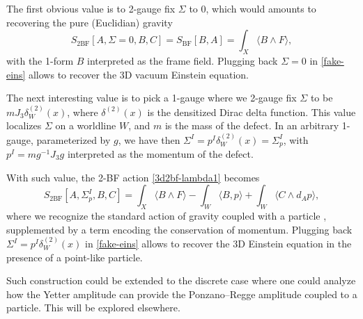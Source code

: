 \documentclass[onecolumn]{article}
\theoremstyle{theorem}
\theoremstyle{remark}
\theoremstyle{example}
\theoremstyle{definition}
\numberwithin{equation}{section}
\begin{document}

The first obvious value is to 2-gauge fix $\Sigma$ to $0$, which would amounts to recovering the pure (Euclidian) gravity 
\begin{equation}
    S_\text{2BF}[A,\Sigma=0, B,C] =S_\text{BF}[B,A]= \int_X \langle B \wedge F \rangle,
\end{equation}
with the 1-form $B$ interpreted as the frame field. Plugging back $\Sigma=0$ in \eqref{fake-eins} allows to recover the 3D vacuum Einstein equation. 


The next interesting value is to pick a 1-gauge where we  2-gauge fix $\Sigma$ to be $m J_3 \delta_W^{(2)}(x)$, where $\delta^{(2)}(x)$ is the densitized Dirac delta function. This value localizes $\Sigma$ on a worldline $W$, and $m$ is the mass of the defect. In an arbitrary 1-gauge, parameterized by $g$, we have then   $\Sigma^I= p^I \delta_W^{(2)}(x)=\Sigma^I_p$, with $p^I= m g^{-1} J_3 g$ interpreted as the momentum of the defect.  

With such value, the 2-BF action \eqref{3d2bf-lambda1} becomes 
\begin{equation}
    S_\text{2BF}[A,\Sigma^I_p, B,C] = \int_X \langle B \wedge F\rangle - \int_W \langle B, p\rangle  + \int_W \langle C\wedge d_A p\rangle,\label{3d2bf-lambda2}
\end{equation}
where we recognize the standard action of gravity coupled with a particle \cite{deSousa1990}, supplemented by a term encoding the conservation of momentum. Plugging back $\Sigma^I=p^I \delta_W^{(2)}(x)$ in \eqref{fake-eins} allows to recover the 3D Einstein equation in the presence of a point-like particle. 

Such construction could be extended to the discrete case where one could analyze how the Yetter amplitude can provide the Ponzano--Regge amplitude coupled to a particle. This will be explored elsewhere. 

\end{document}
